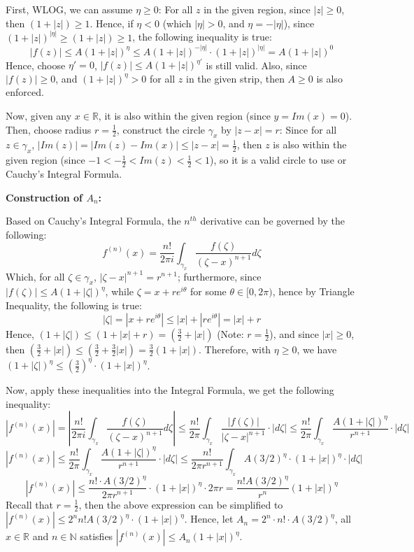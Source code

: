 \documentclass{article}
\begin{document}
First, WLOG, we can assume $\eta\geq 0$: For all $z$ in the given region, since $|z|\geq 0$, then $(1+|z|)\geq 1$.
Hence, if $\eta<0$ (which $|\eta|>0$, and $\eta=-|\eta|$), since $(1+|z|)^{|\eta|} \geq (1+|z|)\geq 1$, the following inequality is true:
$$|f(z)| \leq A(1+|z|)^\eta\leq A(1+|z|)^{-|\eta|}\cdot(1+|z|)^{|\eta|}=A(1+|z|)^0$$
Hence, choose $\eta'=0$, $|f(z)| \leq A(1+|z|)^{\eta'}$ is still valid. Also, since $|f(z)|\geq 0$, and $(1+|z|)^\eta> 0$ for all $z$ in the given strip,
then $A\geq 0$ is also enforced.

\hfill

Now, given any $x\in\mathbb{R}$, it is also within the given region (since $y=Im(x)=0$). Then, choose radius $r=\frac{1}{2}$, 
construct the circle $\gamma_x$ by $|z-x|=r$: Since for all $z\in\gamma_x$, $|Im(z)| = |Im(z)-Im(x)| \leq |z-x| =\frac{1}{2}$,
then $z$ is also within the given region (since $-1<-\frac{1}{2}<Im(z)<\frac{1}{2}<1$), so it is a valid circle to use or Cauchy's Integral Formula.

\hfill

\textbf{Construction of $A_n$:}

Based on Cauchy's Integral Formula, the $n^{th}$ derivative can be governed by the following:
$$f^{(n)}(x)=\frac{n!}{2\pi i}\int_{\gamma_{x}}\frac{f(\zeta)}{(\zeta-x)^{n+1}}d\zeta$$
Which, for all $\zeta\in \gamma_x$, $|\zeta-x|^{n+1}=r^{n+1}$; furthermore, since $|f(\zeta)|\leq A(1+|\zeta|)^\eta$, while $\zeta = x+re^{i\theta}$ for some $\theta\in [0,2\pi)$,
hence by Triangle Inequality, the following is true:
$$|\zeta| = |x+re^{i\theta}| \leq |x|+|re^{i\theta}|=|x|+r$$
Hence, $(1+|\zeta|)\leq (1+|x|+r) = (\frac{3}{2}+|x|)$ (Note: $r=\frac{1}{2}$), and since $|x|\geq 0$, then $(\frac{3}{2}+|x|)\leq(\frac{3}{2}+\frac{3}{2}|x|)= \frac{3}{2}(1+|x|)$.
Therefore, with $\eta\geq 0$, we have $(1+|\zeta|)^\eta \leq (\frac{3}{2})^\eta \cdot (1+|x|)^\eta$.

\hfill

Now, apply these inequalities into the Integral Formula, we get the following inequality:
$$|f^{(n)}(x)| = \left|\frac{n!}{2\pi i}\int_{\gamma_{x}}\frac{f(\zeta)}{(\zeta-x)^{n+1}}d\zeta\right| \leq \frac{n!}{2\pi}\int_{\gamma_x}\frac{|f(\zeta)|}{|\zeta-x|^{n+1}}\cdot|d\zeta|\leq \frac{n!}{2\pi}\int_{\gamma_x}\frac{A(1+|\zeta|)^\eta}{r^{n+1}}\cdot|d\zeta|$$
$$|f^{(n)}(x)|\leq \frac{n!}{2\pi}\int_{\gamma_x}\frac{A(1+|\zeta|)^\eta}{r^{n+1}}\cdot|d\zeta| \leq \frac{n!}{2\pi r^{n+1}}\int_{\gamma_x}A(3/2)^\eta\cdot(1+|x|)^\eta\cdot |d\zeta| $$
$$|f^{(n)}(x)|\leq \frac{n!\cdot A(3/2)^\eta}{2\pi r^{n+1}}\cdot (1+|x|)^\eta\cdot 2\pi r = \frac{n! A(3/2)^\eta}{r^n}(1+|x|)^\eta$$
Recall that $r=\frac{1}{2}$, then the above expression can be simplified to $|f^{(n)}(x)|\leq 2^nn!A(3/2)^\eta\cdot (1+|x|)^\eta$.
Hence, let $A_n = 2^n\cdot n!\cdot A(3/2)^\eta$, all $x\in\mathbb{R}$ and $n\in\mathbb{N}$ satisfies $|f^{(n)}(x)|\leq A_n(1+|x|)^\eta$.
\end{document}
